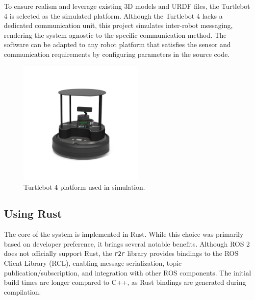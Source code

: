 To ensure realism and leverage existing 3D models and URDF files, the Turtlebot 4 \cite{tb4} is selected as the simulated platform. Although the Turtlebot 4 lacks a dedicated communication unit, this project simulates inter-robot messaging, rendering the system agnostic to the specific communication method. The software can be adapted to any robot platform that satisfies the sensor and communication requirements by configuring parameters in the source code.

\begin{figure}[h]
    \begin{center}
        \includegraphics[width=0.55\textwidth]{figures/tb4.png}
    \end{center}
    \caption{Turtlebot 4 platform used in simulation.}
    \label{fig:tb4}
\end{figure}

\subsection{Using Rust}

The core of the system is implemented in Rust. While this choice was primarily based on developer preference, it brings several notable benefits. Although ROS 2 does not officially support Rust, the \texttt{r2r} library \cite{r2r} provides bindings to the ROS Client Library (RCL), enabling message serialization, topic publication/subscription, and integration with other ROS components. The initial build times are longer compared to C++, as Rust bindings are generated during compilation.\\



